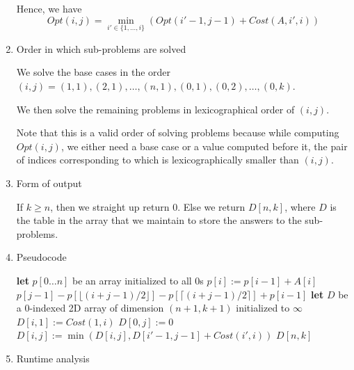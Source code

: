 \begin{enumerate}
        Hence, we have
        $$Opt(i, j) = \min_{i' \in \{1, \ldots, i\}} \left(Opt(i' - 1, j - 1) + Cost(A, i', i)\right)$$

\item Order in which sub-problems are solved

    We solve the base cases in the order $(i, j) = (1, 1), (2, 1), \ldots, (n, 1), (0, 1), (0, 2), \ldots, (0, k)$.

    We then solve the remaining problems in lexicographical order of $(i, j)$.

    Note that this is a valid order of solving problems because while computing $Opt(i, j)$, we either need a base case or a value computed before it, the pair of indices corresponding to which is lexicographically smaller than $(i, j)$.

\item Form of output

    If $k \ge n$, then we straight up return 0. Else we return $D[n, k]$, where $D$ is the table in the array that we maintain to store the answers to the sub-problems.

\item Pseudocode

    \begin{algorithmic}[1]
                \State {}
            \EndIf
            \State \textbf{let} $p[0\ldots n]$ be an array initialized to all 0s
                \State $p[i] := p[i - 1] + A[i]$
            \EndFor
                \State \Return $p[j-1]-p[\lfloor(i+j-1)/2\rfloor]-p[\lceil(i+j-1)/2\rceil]+p[i-1]$
            \EndFunction
            \State \textbf{let} $D$ be a 0-indexed 2D array of dimension $(n + 1, k + 1)$ initialized to $\infty$
                \State $D[i, 1] := Cost(1, i)$
            \EndFor
                \State $D[0, j] := 0$
            \EndFor
                        \State $D[i, j] := \min(D[i, j], D[i' - 1, j - 1] + Cost(i', i))$
                    \EndFor
                \EndFor
            \EndFor
            \State \Return $D[n, k]$
        \EndFunction
    \end{algorithmic}

\item Runtime analysis


\end{enumerate}
